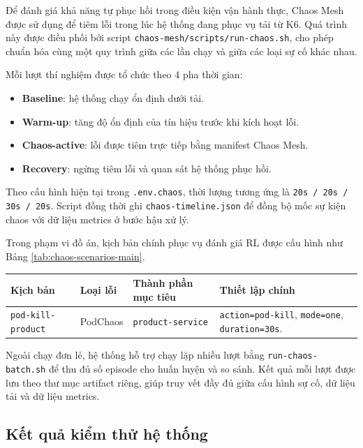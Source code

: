 Để đánh giá khả năng tự phục hồi trong điều kiện vận hành thực, Chaos Mesh được sử dụng để tiêm lỗi trong lúc hệ thống đang phục vụ tải từ K6. Quá trình này được điều phối bởi script \texttt{chaos-mesh/scripts/run-chaos.sh}, cho phép chuẩn hóa cùng một quy trình giữa các lần chạy và giữa các loại sự cố khác nhau.

Mỗi lượt thí nghiệm được tổ chức theo 4 pha thời gian:
\begin{itemize}
    \item \textbf{Baseline}: hệ thống chạy ổn định dưới tải.
    \item \textbf{Warm-up}: tăng độ ổn định của tín hiệu trước khi kích hoạt lỗi.
    \item \textbf{Chaos-active}: lỗi được tiêm trực tiếp bằng manifest Chaos Mesh.
    \item \textbf{Recovery}: ngừng tiêm lỗi và quan sát hệ thống phục hồi.
\end{itemize}
\noindent Theo cấu hình hiện tại trong \texttt{.env.chaos}, thời lượng tương ứng là \texttt{20s / 20s / 30s / 20s}. Script đồng thời ghi \texttt{chaos-timeline.json} để đồng bộ mốc sự kiện chaos với dữ liệu metrics ở bước hậu xử lý.

Trong phạm vi đồ án, kịch bản chính phục vụ đánh giá RL được cấu hình như Bảng \ref{tab:chaos-scenarios-main}.

\begin{center}
\label{tab:chaos-scenarios-main}
\footnotesize
\renewcommand{\arraystretch}{1.0}
\begin{tabular}{|L{4.3cm}|L{2.7cm}|L{3.2cm}|L{4.4cm}|}
\hline
\textbf{Kịch bản} & \textbf{Loại lỗi} & \textbf{Thành phần mục tiêu} & \textbf{Thiết lập chính} \\ \hline
\texttt{pod-kill-product} & PodChaos & \texttt{product-service} & \texttt{action=pod-kill}, \texttt{mode=one}, \texttt{duration=30s}. \\ \hline
\end{tabular}
\end{center}

Ngoài chạy đơn lẻ, hệ thống hỗ trợ chạy lặp nhiều lượt bằng \texttt{run-chaos-batch.sh} để thu đủ số episode cho huấn luyện và so sánh. Kết quả mỗi lượt được lưu theo thư mục artifact riêng, giúp truy vết đầy đủ giữa cấu hình sự cố, dữ liệu tải và dữ liệu metrics.

\subsection{Kết quả kiểm thử hệ thống}

